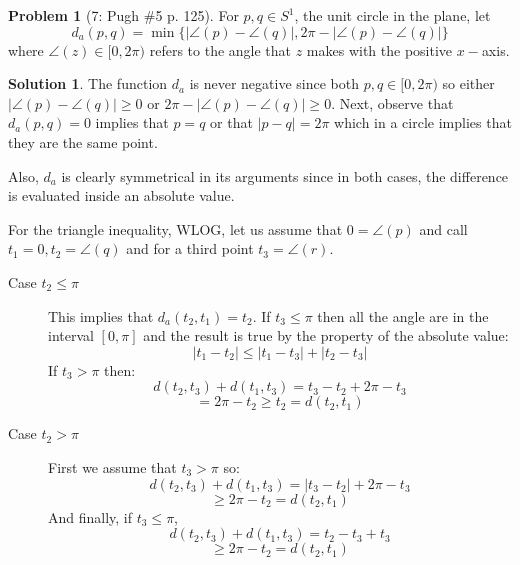 \documentclass{article}
\theoremstyle{definition}
\newtheorem*{soln}{Solution}
\newtheorem*{prob}{Problem}
\theoremstyle{theorem}
\begin{document}
\begin{prob}[7: Pugh \#5 p. 125]
    For $p,q\in S^1$, the unit circle in the plane, let
    $$d_a(p,q) = \min\{|\angle(p) - \angle(q)|, 2\pi-|\angle(p) - \angle(q)|  \}$$
    where $\angle(z) \in [0,2\pi)$ refers to the angle that $z$ makes with the positive $x-$axis.
\end{prob}
\begin{soln}
    The function $d_a$ is never negative since both $p,q\in [0,2\pi)$ so either $ |\angle(p) - \angle(q)|\geq 0$ or $2\pi - |\angle(p) - \angle(q)|\geq 0$. Next, observe that $d_a(p,q)=0$ implies that $p=q$ or that $|p-q| = 2\pi$ which in a circle implies that they are the same point.

    Also, $d_a$ is clearly symmetrical in its arguments since in both cases, the difference is evaluated inside an absolute value.

    For the triangle inequality, WLOG, let us assume that $0 =  \angle(p)$ and call $t_1=0, t_2 = \angle(q)$ and for a third point $t_3 = \angle(r)$.
    \begin{description}
        \item[Case $t_2\leq \pi$]
            This implies that $d_a(t_2,t_1) = t_2$. If $t_3\leq \pi$ then all the angle are in the interval $[0,\pi]$ and the result is true by the property of the absolute value:
            $$|t_1-t_2| \leq |t_1-t_3| + |t_2-t_3|$$
            If $t_3>\pi$ then:
            $$d(t_2,t_3) + d(t_1,t_3) = t_3 - t_2 + 2\pi - t_3$$
            $$= 2\pi - t_2\geq t_2 = d(t_2,t_1)$$

        \item[Case $t_2>\pi$]
            First we assume that $t_3>\pi$ so:
            $$d(t_2,t_3) + d(t_1,t_3) = |t_3 - t_2| + 2\pi - t_3$$
            $$\geq 2\pi - t_2 = d(t_2,t_1)$$
            And finally, if $t_3\leq \pi$, 
            $$d(t_2,t_3) + d(t_1,t_3) = t_2 - t_3 +  t_3$$
            $$\geq 2\pi - t_2 = d(t_2,t_1)$$
    \end{description}
\end{soln}
\vspace{1in}
\end{document}
